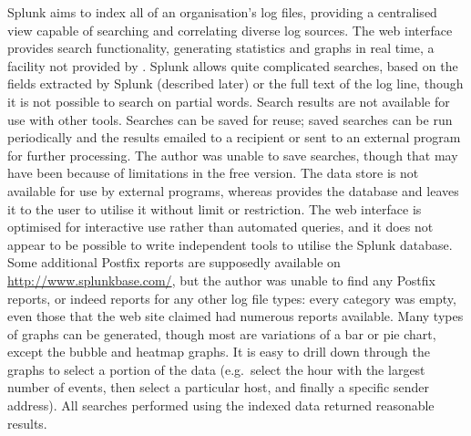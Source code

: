 Splunk aims to index all of an organisation's log files, providing a
centralised view capable of searching and correlating diverse log sources.
The web interface provides search functionality, generating statistics and
graphs in real time, a facility not provided by \parsername{}.  Splunk
allows quite complicated searches, based on the fields extracted by Splunk
(described later) or the full text of the log line, though it is not
possible to search on partial words.  Search results are not available for
use with other tools.  Searches can be saved for reuse; saved searches can
be run periodically and the results emailed to a recipient or sent to an
external program for further processing.  The author was unable to save
searches, though that may have been because of limitations in the free
version.  The data store is not available for use by external programs,
whereas \parsername{} provides the database and leaves it to the user to
utilise it without limit or restriction.  The web interface is optimised
for interactive use rather than automated queries, and it does not appear
to be possible to write independent tools to utilise the Splunk database.
Some additional Postfix reports are supposedly available on
\url{http://www.splunkbase.com/}, but the author was unable to find any
Postfix reports, or indeed reports for any other log file types: every
category was empty, even those that the web site claimed had numerous
reports available.  Many types of graphs can be generated, though most are
variations of a bar or pie chart, except the bubble and heatmap graphs.  It
is easy to drill down through the graphs to select a portion of the data
(e.g.\ select the hour with the largest number of events, then select a
particular host, and finally a specific sender address).  All searches
performed using the indexed data returned reasonable results.

